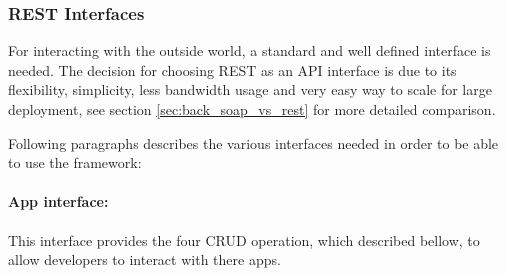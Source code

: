 \subsubsection{REST Interfaces} For interacting with the outside world, a standard and well defined interface is needed. The decision for choosing REST as an API interface is due to its flexibility, simplicity, less bandwidth usage and very easy way to scale for large deployment, see section \ref{sec:back_soap_vs_rest} for more detailed comparison.

Following paragraphs describes the various interfaces needed in order to be able to use the framework:

\paragraph{App interface:} This interface provides the four CRUD operation, which described bellow, to allow developers to interact with there apps.

